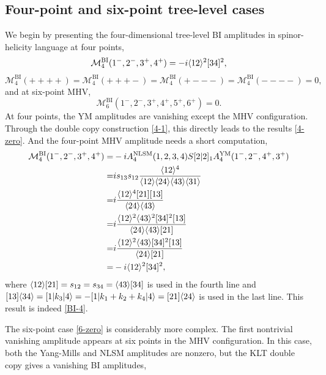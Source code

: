 \documentclass[a4paper,11pt]{article}
\begin{document}
\subsection{Four-point and six-point tree-level cases}
We begin by presenting the four-dimensional tree-level BI amplitudes in spinor-helicity language \cite{Boels:2008fc} at four points,
\begin{equation}\label{BI-4}
    \mathcal{M}^{\text{BI}}_4(1^-,2^-,3^+,4^+)=-i\langle 12 \rangle^2[34]^2,
\end{equation}
\begin{equation}\label{4-zero}
    \mathcal{M}^{\text{BI}}_4(++++)=\mathcal{M}^{\text{BI}}_4(+++-)=\mathcal{M}^{\text{BI}}_4(+---)=\mathcal{M}^{\text{BI}}_4(----)=0,
\end{equation}
and at six-point MHV,
\begin{equation}\label{6-zero}
    \mathcal{M}^{\text{BI}}_6(1^-,2^-,3^+,4^+,5^+,6^+)=0.
\end{equation}
At four points, the YM amplitudes are vanishing except the MHV configuration. 
Through the double copy construction \eqref{4-1}, this directly leads to the results \eqref{4-zero}.
And the four-point MHV amplitude needs a short computation,
\begin{equation}
    \begin{split}
    \mathcal{M}^{\text{BI}}_4(1^-,2^-,3^+,4^+)
    =&-i A_4^{\text{NLSM}}(1,2,3,4)S[2|2]_1 A_4^{\text{YM}}(1^-,2^-,4^+,3^+)\\
    =&i s_{13}s_{12}\frac{\langle 12 \rangle^4}{\langle 12 \rangle\langle 24 \rangle\langle 43 \rangle\langle 31 \rangle}\\
    =&i\frac{\langle 12 \rangle^4 [21][13]}{\langle 24 \rangle\langle 43 \rangle}\\
    =&i\frac{\langle 12 \rangle^2 \langle 43 \rangle^2[34]^2[13]}{\langle 24 \rangle\langle 43 \rangle[21]}\\
    =&i\frac{\langle 12 \rangle^2 \langle 43 \rangle[34]^2[13]}{\langle 24 \rangle[21]}\\
    =&-i\langle 12 \rangle^2[34]^2,
    \end{split}
\end{equation}
where $\langle 12 \rangle[21]=s_{12}=s_{34}=\langle 43 \rangle[34]$ is used in the fourth line and $[13]\langle 34 \rangle=[1|k_3|4\rangle=-[1|k_1+k_2+k_4|4\rangle=[21]\langle 24 \rangle$
is used in the last line. This result is indeed \eqref{BI-4}.\par
The six-point case \eqref{6-zero} is considerably more complex. The first nontrivial vanishing amplitude appears at six points in the MHV configuration. 
In this case, both the Yang-Mills and NLSM amplitudes are nonzero, but the KLT double copy gives a vanishing BI amplitudes,
\end{document}
